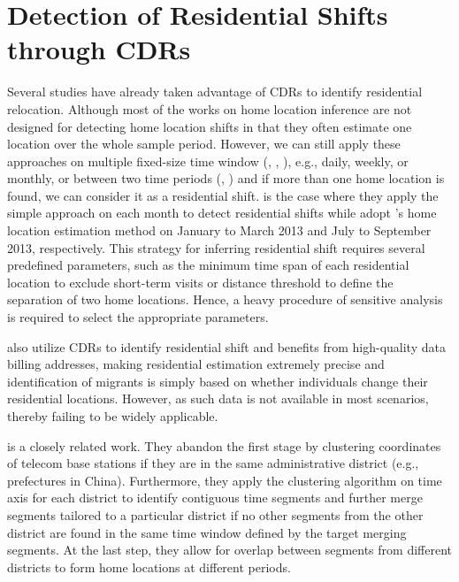 

\section{Detection of Residential Shifts through CDRs}\label{sec:2_detection_of_residential_shifts_through_cdrs}
Several studies have already taken advantage of CDRs to identify residential relocation.
Although most of the works on home location inference are not designed for detecting home location shifts in that they often estimate one location over the whole sample period.
However, we can still apply these approaches on multiple fixed-size time window (\cite{blumenstock2012inferring}, \cite{phithakkitnukoon2022inferring}, \cite{blumenstock2025migration}), e.g., daily, weekly, or monthly, or between two time periods (\cite{lai2019exploring}, \cite{dias2022framework}) and if more than one home location is found, we can consider it as a residential shift.
\cite{phithakkitnukoon2022inferring} is the case where they apply the simple approach on each month to detect residential shifts while \cite{dias2022framework} adopt \cite{isaacman2011identifying}'s home location estimation method on January to March 2013 and July to September 2013, respectively.
This strategy for inferring residential shift requires several predefined parameters, such as the minimum time span of each residential location to exclude short-term visits or distance threshold to define the separation of two home locations.
Hence, a heavy procedure of sensitive analysis is required to select the appropriate parameters.

\cite{buchel2020calling} also utilize CDRs to identify residential shift and benefits from high-quality data billing addresses, making residential estimation extremely precise and identification of migrants is simply based on whether individuals change their residential locations.
However, as such data is not available in most scenarios, thereby failing to be widely applicable.

\cite{chi2020general} is a closely related work.
They abandon the first stage by clustering coordinates of telecom base stations if they are in the same administrative district (e.g., prefectures in China).
Furthermore, they apply the clustering algorithm on time axis for each district to identify contiguous time segments and further merge segments tailored to a particular district if no other segments from the other district are found in the same time window defined by the target merging segments.
At the last step, they allow for overlap between segments from different districts to form home locations at different periods.

